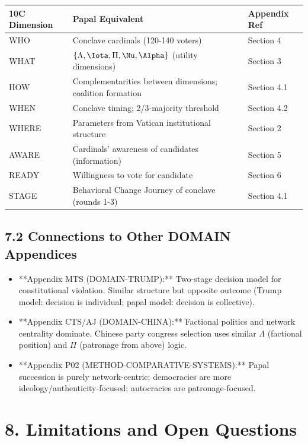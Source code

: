 \begin{table}[h]
\centering
\begin{tabular}{|l|l|l|}
\hline
\textbf{10C Dimension} & \textbf{Papal Equivalent} & \textbf{Appendix Ref} \\
\hline
WHO & Conclave cardinals (120-140 voters) & Section 4 \\
WHAT & $\{\Lambda, \Iota, \Pi, \Nu, \Alpha\}$ (utility dimensions) & Section 3 \\
HOW & Complementarities between dimensions; coalition formation & Section 4.1 \\
WHEN & Conclave timing; 2/3-majority threshold & Section 4.2 \\
WHERE & Parameters from Vatican institutional structure & Section 2 \\
AWARE & Cardinals' awareness of candidates (information) & Section 5 \\
READY & Willingness to vote for candidate & Section 6 \\
STAGE & Behavioral Change Journey of conclave (rounds 1-3) & Section 4.1 \\
\hline
\end{tabular}
\end{table}

\subsection{7.2 Connections to Other DOMAIN Appendices}

\begin{itemize}
\item **Appendix MTS (DOMAIN-TRUMP):** Two-stage decision model for constitutional violation. Similar structure but opposite outcome (Trump model: decision is individual; papal model: decision is collective).

\item **Appendix CTS/AJ (DOMAIN-CHINA):** Factional politics and network centrality dominate. Chinese party congress selection uses similar $\Lambda$ (factional position) and $\Pi$ (patronage from above) logic.

\item **Appendix P02 (METHOD-COMPARATIVE-SYSTEMS):** Papal succession is purely network-centric; democracies are more ideology/authenticity-focused; autocracies are patronage-focused.
\end{itemize}

\section{8. Limitations and Open Questions}


